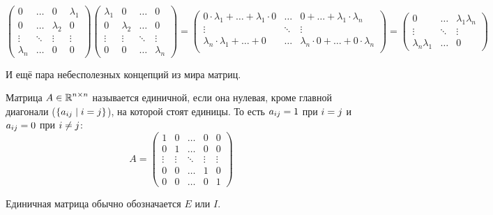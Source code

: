 \documentclass[a4paper,12pt]{article}
\begin{document}
  \begin{solution}
    \[
      \begin{pmatrix}
        0         & \ldots & 0         & \lambda_1\\
        0         & \ldots & \lambda_2 & 0\\
        \vdots    & \ddots & \vdots    & \vdots\\
        \lambda_n & \ldots & 0         & 0
      \end{pmatrix}
      \begin{pmatrix}
        \lambda_1 & 0         & \ldots & 0\\
        0         & \lambda_2 & \ldots & 0\\
        \vdots    & \vdots    & \ddots & \vdots\\
        0         & 0         & \ldots & \lambda_n
      \end{pmatrix}
      = \begin{pmatrix}
        0 \cdot \lambda_1 + \ldots + \lambda_1 \cdot 0
          & \ldots
          & 0 + \ldots + \lambda_1 \cdot \lambda_n\\
        \vdots & \ddots & \vdots\\
        \lambda_n \cdot \lambda_1 + \ldots + 0
          & \ldots
          & \lambda_n \cdot 0 + \ldots + 0 \cdot \lambda_n\\
      \end{pmatrix}
      = \begin{pmatrix}
        0                   & \ldots & \lambda_1 \lambda_n\\
        \vdots              & \ddots & \vdots\\
        \lambda_n \lambda_1 & \ldots & 0
      \end{pmatrix}
    \]
  \end{solution}
  
  
  И ещё пара небесполезных концепций из мира матриц.
  
  \begin{definition}
    Матрица $A \in \operatorname{\mathbb R}^{n \times n}$ называется единичной, если она нулевая, кроме главной диагонали ($\{a_{ij} \hm\mid i \hm= j\}$), на которой стоят единицы.
    То есть $a_{ij} \hm= 1$ при $i \hm= j$ и $a_{ij} \hm= 0$ при $i \hm{\not=} j$:
    \[
      A = \begin{pmatrix}
        1      & 0      & \ldots & 0       & 0\\
        0      & 1      & \ldots & 0       & 0\\
        \vdots & \vdots & \ddots & \vdots & \vdots\\
        0      & 0      & \ldots & 1      & 0\\
        0      & 0      & \ldots & 0      & 1
      \end{pmatrix}
    \]
    
    Единичная матрица обычно обозначается $E$ или $I$.
  \end{definition}
  
\end{document}
